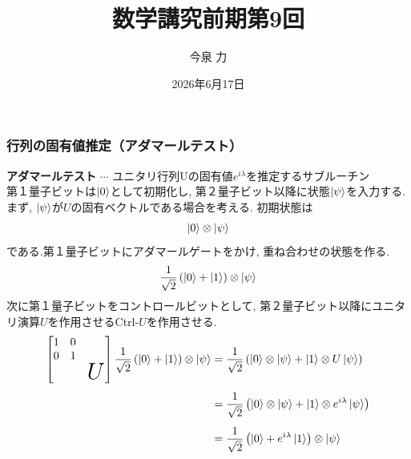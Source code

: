 \documentclass[9pt]{beamer}
\title{数学講究前期第9回}
\author{今泉 力}
\date{2026年6月17日}
\begin{document}
\begin{frame}
  \titlepage
\end{frame}

\begin{frame}
    \frametitle{行列の固有値推定（アダマールテスト）}
    \textbf{アダマールテスト} $\cdots$ ユニタリ行列Uの固有値$e^{i\lambda}$を推定するサブルーチン \\
    第１量子ビットは$\ket{0}$として初期化し, 第２量子ビット以降に状態$\ket{\psi}$を入力する. まず, $\ket{\psi}$が$U$の固有ベクトルである場合を考える. 初期状態は
    \begin{align}
        \ket{0} \otimes \ket{\psi}
    \end{align}
    である.第１量子ビットにアダマールゲートをかけ, 重ね合わせの状態を作る.
    \begin{align}
        \frac{1}{\sqrt{2}} \left( \ket{0} + \ket{1} \right) \otimes \ket{\psi}
    \end{align}
    次に第１量子ビットをコントロールビットとして, 第２量子ビット以降にユニタリ演算$U$を作用させるCtrl-$U$を作用させる.
    \begin{align}
        \begin{bmatrix}
            1 & 0                 &     \\
            0 & 1                 &     \\
              &                   & \text{\huge{$U$}}
        \end{bmatrix}
        \frac{1}{\sqrt{2}} \left( \ket{0} + \ket{1} \right) \otimes \ket{\psi}
        &=
        \frac{1}{\sqrt{2}} \left( \ket{0} \otimes \ket{\psi} + \ket{1} \otimes U\ket{\psi} \right) \\
        &= 
        \frac{1}{\sqrt{2}} \left( \ket{0} \otimes \ket{\psi} + \ket{1} \otimes e^{i\lambda} \ket{\psi} \right) \\
        &= 
        \frac{1}{\sqrt{2}} \left( \ket{0} + e^{i\lambda} \ket{1} \right) \otimes \ket{\psi}
    \end{align}
\end{frame}
\end{document}
